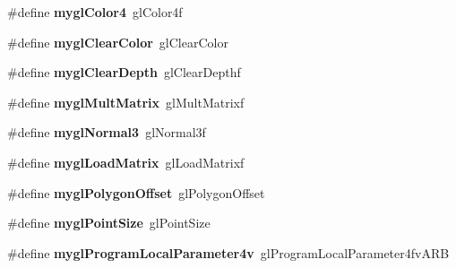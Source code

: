 \begin{DoxyCompactItemize}
\item 
\hypertarget{group___a_p_i___o_g_l_e_s_gae85d7460d488ef720363d1781fb26aca}{\#define {\bfseries mygl\+Color4}~gl\+Color4f}\label{group___a_p_i___o_g_l_e_s_gae85d7460d488ef720363d1781fb26aca}

\item 
\hypertarget{group___a_p_i___o_g_l_e_s_gac59d5f0dd5bc778da67ff6acf3e591d3}{\#define {\bfseries mygl\+Clear\+Color}~gl\+Clear\+Color}\label{group___a_p_i___o_g_l_e_s_gac59d5f0dd5bc778da67ff6acf3e591d3}

\item 
\hypertarget{group___a_p_i___o_g_l_e_s_ga5fa17f1933129a5c7bbaa437fc8e8db2}{\#define {\bfseries mygl\+Clear\+Depth}~gl\+Clear\+Depthf}\label{group___a_p_i___o_g_l_e_s_ga5fa17f1933129a5c7bbaa437fc8e8db2}

\item 
\hypertarget{group___a_p_i___o_g_l_e_s_gab580f995c22cf438ea5335904089e5e1}{\#define {\bfseries mygl\+Mult\+Matrix}~gl\+Mult\+Matrixf}\label{group___a_p_i___o_g_l_e_s_gab580f995c22cf438ea5335904089e5e1}

\item 
\hypertarget{group___a_p_i___o_g_l_e_s_ga34effc710ffc54fa36186d2e972fcf75}{\#define {\bfseries mygl\+Normal3}~gl\+Normal3f}\label{group___a_p_i___o_g_l_e_s_ga34effc710ffc54fa36186d2e972fcf75}

\item 
\hypertarget{group___a_p_i___o_g_l_e_s_ga2f968dd21194bc79f28d136ac7b5d6c8}{\#define {\bfseries mygl\+Load\+Matrix}~gl\+Load\+Matrixf}\label{group___a_p_i___o_g_l_e_s_ga2f968dd21194bc79f28d136ac7b5d6c8}

\item 
\hypertarget{group___a_p_i___o_g_l_e_s_gaace30adac38cdbf486a9a1819c20af1e}{\#define {\bfseries mygl\+Polygon\+Offset}~gl\+Polygon\+Offset}\label{group___a_p_i___o_g_l_e_s_gaace30adac38cdbf486a9a1819c20af1e}

\item 
\hypertarget{group___a_p_i___o_g_l_e_s_ga92a4b2016da5d4d72f44aa66c9c716e9}{\#define {\bfseries mygl\+Point\+Size}~gl\+Point\+Size}\label{group___a_p_i___o_g_l_e_s_ga92a4b2016da5d4d72f44aa66c9c716e9}

\item 
\hypertarget{group___a_p_i___o_g_l_e_s_gace2bab1a08bd7a5e0082ade9d54068d8}{\#define {\bfseries mygl\+Program\+Local\+Parameter4v}~gl\+Program\+Local\+Parameter4fv\+A\+R\+B}\label{group___a_p_i___o_g_l_e_s_gace2bab1a08bd7a5e0082ade9d54068d8}


\end{DoxyCompactItemize}
